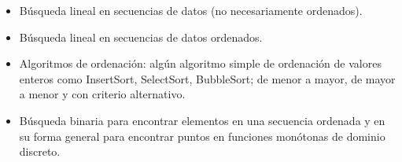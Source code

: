\begin{itemize}
\item[\basic] Búsqueda lineal en secuencias de datos (no necesariamente ordenados).
\item[\basic] Búsqueda lineal en secuencias de datos ordenados.
\item[\advanced]
  Algoritmos de ordenación: algún algoritmo simple de ordenación de valores
  enteros como InsertSort, SelectSort, BubbleSort; de menor a mayor, de mayor a
  menor y con criterio alternativo.
\item[\ultra] Búsqueda binaria para encontrar elementos en una secuencia ordenada
  y en su forma general para encontrar puntos en funciones monótonas
  de dominio discreto.
\end{itemize}


